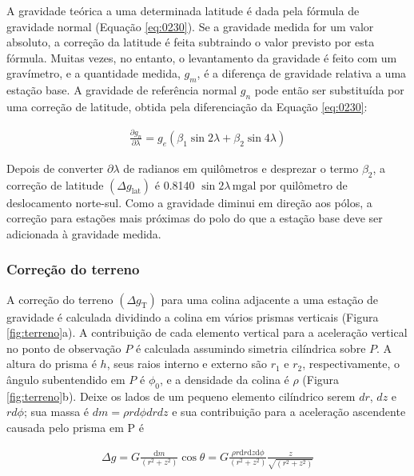 \documentclass[]{book}
\theoremstyle{definition}
\theoremstyle{definition}
\theoremstyle{definition}
\theoremstyle{remark}
\begin{document}
A gravidade teórica a uma determinada latitude é dada pela fórmula de gravidade normal (Equação \eqref{eq:0230}). Se a gravidade medida for um valor absoluto, a correção da latitude é feita subtraindo o valor previsto por esta fórmula. Muitas vezes, no entanto, o levantamento da gravidade é feito com um gravímetro, e a quantidade medida, \(g_m\), é a diferença de gravidade relativa a uma estação base. A gravidade de referência normal \(g_n\) pode então ser substituída por uma correção de latitude, obtida pela diferenciação da Equação \eqref{eq:0230}:

\begin{align}
\frac{\partial g_{n}}{\partial \lambda}=g_{e}\left(\beta_{1} \sin 2 \lambda+\beta_{2} \sin 4 \lambda\right)
\label{eq:0237}
\end{align}

Depois de converter \(\partial \lambda\) de radianos em quilômetros e desprezar o termo \(\beta_2\), a correção de latitude \(\left(\Delta g_{\mathrm{lat}}\right)\) é 0.8140 \(\sin 2 \lambda\, \mathrm{mgal}\) por quilômetro de deslocamento norte-sul. Como a gravidade diminui em direção aos pólos, a correção para estações mais próximas do polo do que a estação base deve ser adicionada à gravidade medida.

\hypertarget{correcao-do-terreno}{%
\subsubsection{Correção do terreno}\label{correcao-do-terreno}}

A correção do terreno \(\left(\Delta g_{\mathrm{T}}\right)\) para uma colina adjacente a uma estação de gravidade é calculada dividindo a colina em vários prismas verticais (Figura \ref{fig:terreno}a). A contribuição de cada elemento vertical para a aceleração vertical no ponto de observação \(P\) é calculada assumindo simetria cilíndrica sobre \(P\). A altura do prisma é \(h\), seus raios interno e externo são \(r_1\) e \(r_2\), respectivamente, o ângulo subentendido em \(P\) é \(\phi_0\), e a densidade da colina é \(\rho\) (Figura \ref{fig:terreno}b). Deixe os lados de um pequeno elemento cilíndrico serem \(dr\), \(dz\) e \(r d\phi\); sua massa é \(dm= \rho r d\phi dr dz\) e sua contribuição para a aceleração ascendente causada pelo prisma em P é

\begin{align}
\Delta g=G \frac{\mathrm{d} m}{\left(r^{2}+z^{2}\right)} \cos \theta=G \frac{\rho r \mathrm{d} r \mathrm{d} z \mathrm{d} \phi}{\left(r^{2}+z^{2}\right)} \frac{z}{\sqrt{\left(r^{2}+z^{2}\right)}} \label{eq:0238}
\end{align}
\end{document}

